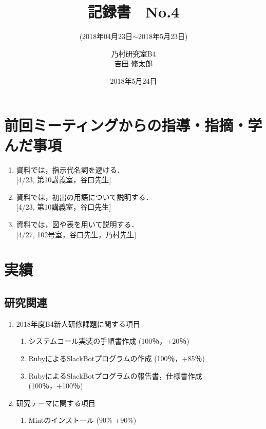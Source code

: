 \documentclass[fleqn, 14pt]{extarticle}
\subtitle{(2018年04月23日$\sim$2018年5月23日)}
\author{乃村研究室B4\\吉田 修太郎}
\date{2018年5月24日}
\title{記録書　No.4}
\begin{document}
\maketitle
\section{前回ミーティングからの指導・指摘・学んだ事項}
\label{sec1}
\begin{enumerate}
\item 資料では，指示代名詞を避ける．\\
  \hfill[4/23, 第10講義室，谷口先生]
\item 資料では，初出の用語について説明する．\\
  \hfill[4/23, 第10講義室，谷口先生]
\item 資料では，図や表を用いて説明する．\\
  \hfill[4/27, 102号室，谷口先生，乃村先生]
\end{enumerate}

\section{実績}
\label{sec2}
\subsection{研究関連}
\label{sec2-1}
\begin{enumerate}
\item 2018年度B4新人研修課題に関する項目
  \hfill
  \label{sec2-1-1}
  \begin{enumerate}
  \item システムコール実装の手順書作成
    \hfill
    \label{sec2-1-1-enum1}
    (100％，+20％)
  \item RubyによるSlackBotプログラムの作成
    \hfill
    \label{sec2-1-1-enum2}
    (100％，+85％)
  \item RubyによるSlackBotプログラムの報告書，仕様書作成 \\
    \hfill
    \label{sec2-1-1-enum3}
    (100％，+100％)
  \end{enumerate}
\item 研究テーマに関する項目
  \label{sec2-1-2}
  \begin{enumerate}
  \item Mintのインストール
    \label{sec2-1-2-enum1}
    \hfill
    (90\% +90\%)
  \end{enumerate}
\end{enumerate}
\end{document}
